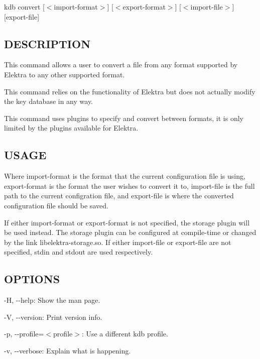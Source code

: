 {\ttfamily kdb convert \mbox{[}$<$import-\/format$>$\mbox{]} \mbox{[}$<$export-\/format$>$\mbox{]} \mbox{[}$<$import-\/file$>$\mbox{]} \mbox{[}export-\/file\mbox{]}}

\subsection*{D\+E\+S\+C\+R\+I\+P\+T\+I\+O\+N}

This command allows a user to convert a file from any format supported by Elektra to any other supported format.

This command relies on the functionality of Elektra but does not actually modify the key database in any way.

This command uses plugins to specify and convert between formats, it is only limited by the plugins available for Elektra.

\subsection*{U\+S\+A\+G\+E}

Where {\ttfamily import-\/format} is the format that the current configuration file is using, {\ttfamily export-\/format} is the format the user wishes to convert it to, {\ttfamily import-\/file} is the full path to the current configration file, and {\ttfamily export-\/file} is where the converted configuration file should be saved.

If either {\ttfamily import-\/format} or {\ttfamily export-\/format} is not specified, the {\ttfamily storage} plugin will be used instead. The {\ttfamily storage} plugin can be configured at compile-\/time or changed by the link {\ttfamily libelektra-\/storage.\+so}. If either {\ttfamily import-\/file} or {\ttfamily export-\/file} are not specified, {\ttfamily stdin} and {\ttfamily stdout} are used respectively.

\subsection*{O\+P\+T\+I\+O\+N\+S}


\begin{DoxyItemize}
\item {\ttfamily -\/\+H}, {\ttfamily -\/-\/help}\+: Show the man page.
\item {\ttfamily -\/\+V}, {\ttfamily -\/-\/version}\+: Print version info.
\item {\ttfamily -\/p}, {\ttfamily -\/-\/profile}=$<$profile$>$\+: Use a different kdb profile.
\item {\ttfamily -\/v}, {\ttfamily -\/-\/verbose}\+: Explain what is happening.
\end{DoxyItemize}


